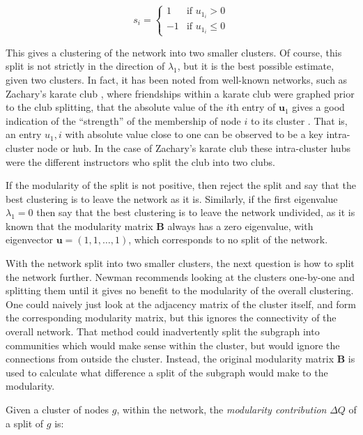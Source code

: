 \begin{equation}
s_i =\left\{ \begin{array}{ll} 1 & \mbox{if } u_{1_i}>0 \\
-1 & \mbox{if } u_{1_i}\leq0 \end{array} \right.
\end{equation}

This gives a clustering of the network into two smaller clusters. Of course, 
this split is not strictly in the direction of $\lambda_1$, but it is the best 
possible estimate, given two 
clusters. In fact, it has been noted from well-known networks, 
such as Zachary's karate club \citep{Zachary1977a}, where friendships within a karate club were graphed prior to the club splitting, that the absolute value of 
the $i$th entry of $\mathbf{u}_1$ gives a good indication of the ``strength'' 
of the membership of node $i$ to its cluster \citep{Newman2006a}. That is, an entry $u_1,i$ with absolute value close to one can be observed to be a key intra-cluster node or hub.  In the case of Zachary's karate club these intra-cluster hubs were the different instructors who split the club into two clubs.

If the modularity of the split is not positive, then reject the 
split and say that the best clustering is to leave the network as it is.  
Similarly, if the first eigenvalue $\lambda_1 = 0$ then say that the best 
clustering is to leave the network undivided, as it is known that the modularity 
matrix $\mathbf{B}$ always has a zero eigenvalue, with eigenvector 
$\mathbf{u} = ( 1,1, \ldots, 1)$, which corresponds to no split of the network.

With the network split into two smaller clusters, the next
question is how to split the network further.  Newman \citep{Newman2006a} recommends looking at the clusters
one-by-one and splitting them until it gives no benefit to the modularity
of the overall clustering.  One could naively just look at the
adjacency matrix of the cluster itself, and form the 
corresponding modularity matrix, but this ignores the connectivity of the
overall network.  That method could inadvertently split the subgraph into communities 
which would make sense within the cluster, but would ignore the connections 
from outside the cluster. Instead, the original modularity 
matrix $\mathbf{B}$ is used to calculate what difference a split of the subgraph would 
make to the modularity.

Given a cluster of nodes $g$, within the network, the \emph{modularity contribution} $\Delta Q$ of a 
split of $g$ is:

